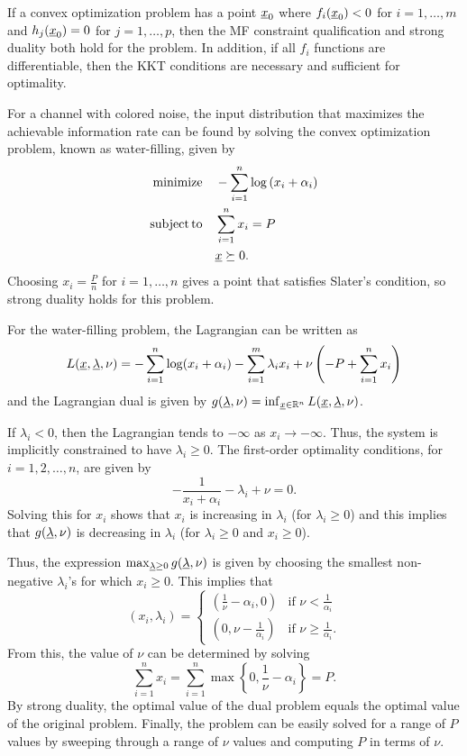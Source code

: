 \begin{theorem}
If a convex optimization problem has a point $\underline{x}_0$ where $f_i(\underline{x}_0) < 0$ for $i=1,\ldots,m$ and $h_j (\underline{x}_0) = 0$ for $j=1,\ldots,p$, then the MF constraint qualification and strong duality both hold for the problem.
In addition, if all $f_i$ functions are differentiable, then the KKT conditions are necessary and sufficient for optimality.
\end{theorem}


\begin{example}
For a channel with colored noise, the input distribution that maximizes the achievable information rate can be found by solving the convex optimization problem, known as water-filling, given by
\begin{align*}
\mathrm{minimize} \quad & -\sum_{i=1}^n \log \left( x_i + \alpha_i \right) \\
\mathrm{subject\,to} \quad & \sum_{i=1}^n x_i = P \\
& \underline{x} \succeq 0.
\end{align*}
Choosing $x_i = \frac{P}{n}$ for $i=1,\ldots,n$ gives a point that satisfies Slater's condition, so strong duality holds for this problem.
\end{example}

\begin{example}
For the water-filling problem, the Lagrangian can be written as
\[ L(\underline{x},\underline{\lambda},\nu) = - \sum_{i=1}^n \log(x_i + \alpha_i) - \sum_{i=1}^m \lambda_i x_i + \nu \left( -P + \sum_{i=1}^n x_i \right)  \]
and the Lagrangian dual is given by $g(\underline{\lambda},\nu)
= \inf_{\underline{x}\in \mathbb{R}^n} L(\underline{x},\underline{\lambda},\nu)$.

If $\lambda_i <0$, then the Lagrangian tends to $-\infty$ as $x_i \to -\infty$.
Thus, the system is implicitly constrained to have $\lambda_i \geq 0$.
The first-order optimality conditions, for $i=1,2,\ldots,n$, are given by
\[ -\frac{1}{x_i + \alpha_i} - \lambda_i + \nu = 0.
\]
Solving this for $x_i$ shows that $x_i$ is increasing in $\lambda _i$ (for $\lambda_i \geq 0$) and this implies that $g(\underline{\lambda},\nu)$ is decreasing in $\lambda_i$ (for $\lambda_i \geq 0$ and $x_i \geq 0$).

Thus, the expression
$\max_{\underline{\lambda} \geq 0} g(\underline{\lambda},\nu)$
is given by choosing the smallest non-negative $\lambda_i$'s for which $x_i \geq 0$.
This implies that
\[ (x_i,\lambda_i) = \begin{cases} \left( \frac{1}{\nu} - \alpha _i, 0 \right) & \text{if }\nu < \frac{1}{\alpha_i} \\ \left(0,\nu-\frac{1}{\alpha_i}\right) & \text{if } \nu \geq \frac{1}{\alpha_i}. \end{cases} \]
From this, the value of $\nu$ can be determined by solving
\[\sum_{i=1}^n x_i = \sum_{i=1}^n \max \left\{ 0,\frac{1}{\nu}-\alpha_i \right\} = P. \]
By strong duality, the optimal value of the dual problem equals the optimal value of the original problem.
Finally, the problem can be easily solved for a range of $P$ values by sweeping through a range of $\nu$ values and computing $P$ in terms of $\nu$.
\end{example}

